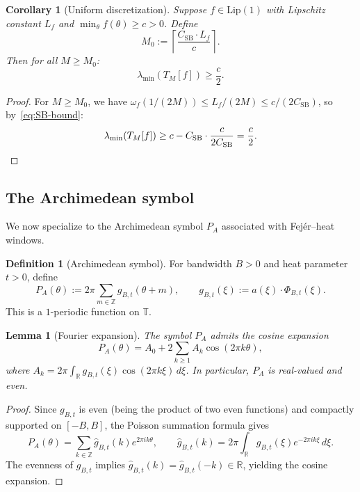 \documentclass[11pt,a4paper]{article}
\newtheorem{lemma}[theorem]{Lemma}
\newtheorem{corollary}[theorem]{Corollary}
\theoremstyle{definition}
\newtheorem{definition}[theorem]{Definition}
\theoremstyle{remark}
\newcommand{\R}{\mathbb{R}}
\newcommand{\Z}{\mathbb{Z}}
\newcommand{\T}{\mathbb{T}}
\begin{document}
\begin{corollary}[Uniform discretization]\label{cor:discretization}
Suppose $f \in \mathrm{Lip}(1)$ with Lipschitz constant $L_f$ and $\min_\theta f(\theta) \geq c > 0$. Define
\[
  M_0 := \left\lceil \frac{C_{\mathrm{SB}} \cdot L_f}{c} \right\rceil.
\]
Then for all $M \geq M_0$:
\[
  \lambda_{\min}(T_M[f]) \geq \frac{c}{2}.
\]
\end{corollary}

\begin{proof}
For $M \geq M_0$, we have $\omega_f(1/(2M)) \leq L_f/(2M) \leq c/(2C_{\mathrm{SB}})$, so by~\eqref{eq:SB-bound}:
\[
  \lambda_{\min}(T_M[f]) \geq c - C_{\mathrm{SB}} \cdot \frac{c}{2C_{\mathrm{SB}}} = \frac{c}{2}. \qedhere
\]
\end{proof}

\subsection{The Archimedean symbol}

We now specialize to the Archimedean symbol $P_A$ associated with Fej\'er--heat windows.

\begin{definition}[Archimedean symbol]
For bandwidth $B > 0$ and heat parameter $t > 0$, define
\begin{equation}\label{eq:PA-explicit}
  P_A(\theta) := 2\pi \sum_{m \in \Z} g_{B,t}(\theta + m), \qquad
  g_{B,t}(\xi) := a(\xi) \cdot \Phi_{B,t}(\xi).
\end{equation}
This is a $1$-periodic function on $\T$.
\end{definition}

\begin{lemma}[Fourier expansion]\label{lem:PA-fourier}
The symbol $P_A$ admits the cosine expansion
\[
  P_A(\theta) = A_0 + 2\sum_{k \geq 1} A_k \cos(2\pi k \theta),
\]
where $A_k = 2\pi \int_{\R} g_{B,t}(\xi) \cos(2\pi k \xi)\, d\xi$. In particular, $P_A$ is real-valued and even.
\end{lemma}

\begin{proof}
Since $g_{B,t}$ is even (being the product of two even functions) and compactly supported on $[-B, B]$, the Poisson summation formula gives
\[
  P_A(\theta) = \sum_{k \in \Z} \hat{g}_{B,t}(k) e^{2\pi i k \theta}, \qquad
  \hat{g}_{B,t}(k) = 2\pi \int_{\R} g_{B,t}(\xi) e^{-2\pi i k \xi}\, d\xi.
\]
The evenness of $g_{B,t}$ implies $\hat{g}_{B,t}(k) = \hat{g}_{B,t}(-k) \in \R$, yielding the cosine expansion.
\end{proof}
\end{document}
